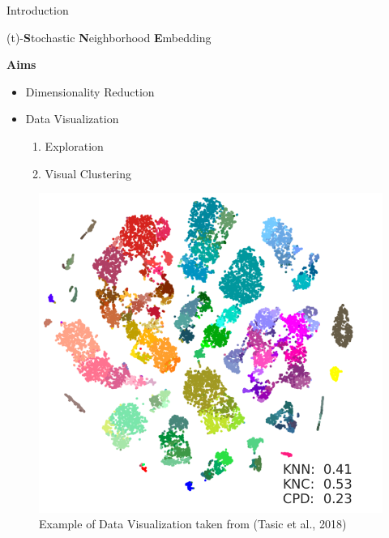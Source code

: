 \documentclass[10pt]{beamer}
\theoremstyle{definition}
\newcommand{\1}{\mathbbm{1}}
\begin{document}
\begin{frame}{Introduction}{}
  \begin{center}
    (t)-{\bf S}tochastic {\bf N}eighborhood {\bf E}mbedding
  \end{center}
  \begin{minipage}{0.4\textwidth}
    {\bf Aims}
    \begin{itemize}
      \item Dimensionality Reduction
      \item Data Visualization
        \begin{enumerate}
          \item Exploration
          \item Visual Clustering
        \end{enumerate}
    \end{itemize}
  \end{minipage}\hfill
  \begin{minipage}{0.4\textwidth}
    \begin{figure}[h!]
      \centering
      \includegraphics[scale=0.2]{./pic/example.png}
      \caption{Example of Data Visualization taken from (Tasic et al., 2018)}
    \end{figure}
  \end{minipage} 
\end{frame}
\end{document}

